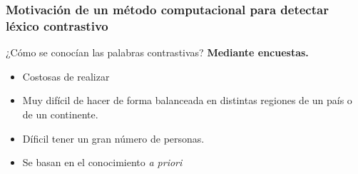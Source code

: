 
\begin{frame}[t]\frametitle{Motivación de un método computacional para detectar léxico contrastivo}
    
    ¿Cómo se conocían las palabras contrastivas?
    \textbf{Mediante encuestas.}
    \begin{itemize}
        \item Costosas de realizar
        \item Muy difícil de hacer de forma balanceada en distintas regiones de un país o de un continente.
        \item Díficil tener un gran número de personas.
        \item \alert{Se basan en el conocimiento \textit{a priori}}
    \end{itemize}
\end{frame}
